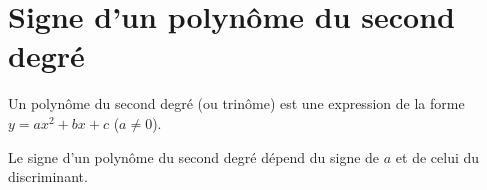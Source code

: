 \documentclass[12pt,a4paper]{article}
\begin{document}


\section{Signe d'un polynôme du second degré}

\begin{mydef}
	Un polynôme du second degré (ou trinôme) est une expression de la forme $y=ax^2+bx+c$ ($a \neq 0$).
\end{mydef}

\begin{myprop}
	Le signe d'un polynôme du second degré dépend du signe de $a$ et de celui du discriminant.
\end{myprop}	
		
		
\end{document}
